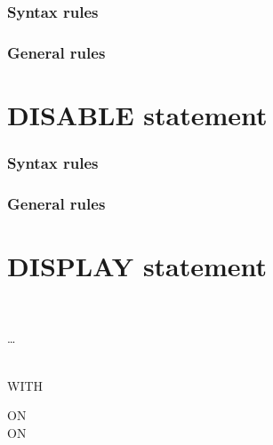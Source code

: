 \subsubsection{Syntax rules}

\subsubsection{General rules}

\section{DISABLE statement}

\begin{syntax}[\deletedcolour]
\end{syntax}

\subsubsection{Syntax rules}

\subsubsection{General rules}

\section{DISPLAY statement}

\begin{syntax}
  \begin{1=}
    \identifier \\
    \literal
  \end{1=} \ldots
  \begin{0+}
     \mnemonicname \\
    WITH  
  \end{0+}

  \begin{0+}
    ON  \imperativestatement \\
     ON  \imperativestatement \\
  \end{0+}

  \begin{0-1}
  \end{0-1}
\end{syntax}

